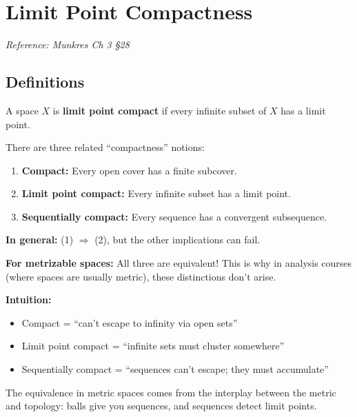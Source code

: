 \documentclass[11pt]{report}
\begin{document}
\section{Limit Point Compactness}

\textit{Reference: Munkres Ch 3 \S 28}

\subsection{Definitions}

\begin{defbox}
A space $X$ is \textbf{limit point compact} if every infinite subset of $X$ has a limit point.
\end{defbox}

\begin{rembox}
There are three related ``compactness'' notions:
\begin{enumerate}
    \item \textbf{Compact:} Every open cover has a finite subcover.
    \item \textbf{Limit point compact:} Every infinite subset has a limit point.
    \item \textbf{Sequentially compact:} Every sequence has a convergent subsequence.
\end{enumerate}

\textbf{In general:} (1) $\Rightarrow$ (2), but the other implications can fail.

\textbf{For metrizable spaces:} All three are equivalent! This is why in analysis courses (where spaces are usually metric), these distinctions don't arise.

\textbf{Intuition:} 
\begin{itemize}
    \item Compact = ``can't escape to infinity via open sets''
    \item Limit point compact = ``infinite sets must cluster somewhere''
    \item Sequentially compact = ``sequences can't escape; they must accumulate''
\end{itemize}

The equivalence in metric spaces comes from the interplay between the metric and topology: balls give you sequences, and sequences detect limit points.
\end{rembox}
\end{document}
